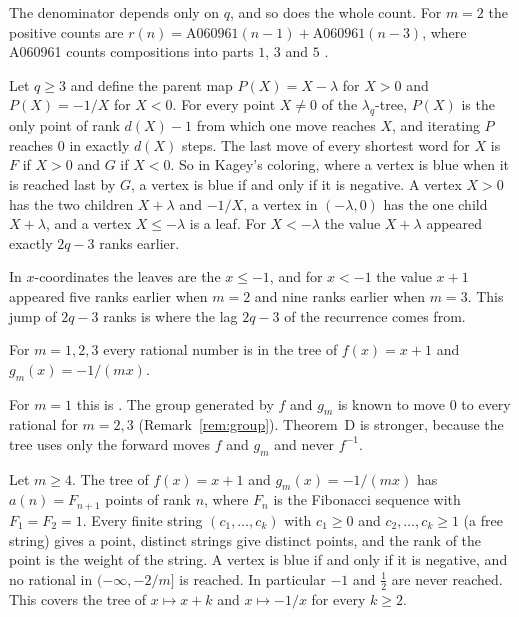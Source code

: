 The denominator depends only on $q$, and so does the whole count. For $m=2$ the positive counts
are $r(n)=\mathrm{A060961}(n-1)+\mathrm{A060961}(n-3)$, where A060961 counts compositions into
parts $1$, $3$ and $5$ \cite{oeisA060961}.

\begin{thmC}
Let $q\ge3$ and define the parent map $P(X)=X-\lambda$ for $X>0$ and $P(X)=-1/X$ for $X<0$. For
every point $X\neq0$ of the $\lambda_q$-tree, $P(X)$ is the only point of rank $d(X)-1$ from which
one move reaches $X$, and iterating $P$ reaches $0$ in exactly $d(X)$ steps. The last move of every
shortest word for $X$ is $F$ if $X>0$ and $G$ if $X<0$. So in Kagey's coloring, where a vertex is blue
when it is reached last by $G$, a vertex is blue if and only if it is negative. A
vertex $X>0$ has the two children $X+\lambda$ and $-1/X$, a vertex in $(-\lambda,0)$ has the one child
$X+\lambda$, and a vertex $X\le-\lambda$ is a leaf. For $X<-\lambda$ the value $X+\lambda$ appeared
exactly $2q-3$ ranks earlier.
\end{thmC}

In $x$-coordinates the leaves are the $x\le-1$, and for $x<-1$ the value $x+1$ appeared five ranks
earlier when $m=2$ and nine ranks earlier when $m=3$. This jump of $2q-3$ ranks is where the lag
$2q-3$ of the recurrence comes from.

\begin{thmD}
For $m=1,2,3$ every rational number is in the tree of $f(x)=x+1$ and $g_m(x)=-1/(mx)$.
\end{thmD}

For $m=1$ this is \cite[Theorem~3.6]{P137}. The group generated by $f$ and $g_m$ is known to move $0$
to every rational for $m=2,3$ (Remark~\ref{rem:group}). Theorem~D is stronger, because the tree uses
only the forward moves $f$ and $g_m$ and never $f^{-1}$.

\begin{thmE}
Let $m\ge4$. The tree of $f(x)=x+1$ and $g_m(x)=-1/(mx)$ has $a(n)=F_{n+1}$ points of rank $n$,
where $F_n$ is the Fibonacci sequence with $F_1=F_2=1$. Every finite string $(c_1,\dots,c_k)$ with
$c_1\ge0$ and $c_2,\dots,c_k\ge1$ (a free string) gives a point, distinct strings give distinct
points, and the rank of the point is the weight of the string. A vertex is blue if and only if it is negative, and no
rational in $(-\infty,-2/m]$ is reached. In particular $-1$ and $\tfrac12$ are never reached. This
covers the tree of $x\mapsto x+k$ and $x\mapsto-1/x$ for every $k\ge2$.
\end{thmE}

